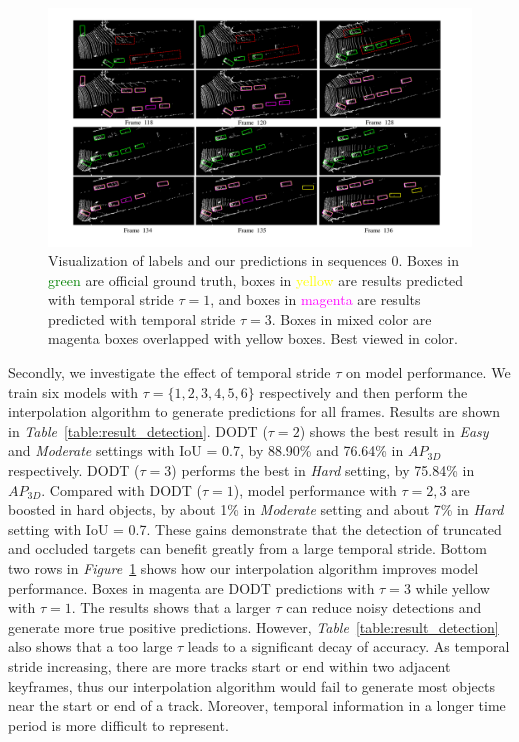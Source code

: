 \documentclass[letterpaper, 10pt, conference]{ieeeconf}  %
\def\figurename{\emph{Figure}}
\def\tablename{\emph{Table}}
\begin{document}
\begin{figure}\centering
	\vspace{-0.8cm}
	\rule{0pt}{1ex}
	\begin{center}
		\includegraphics[trim={2cm, 1cm, 2cm, 1cm}, clip, width=\textwidth]{images/examples.pdf}
	\end{center}
	\setlength{\abovecaptionskip}{-3pt} 
	\caption{Visualization of labels and our predictions in sequences 0. Boxes in \textcolor{green}{green} are official ground truth, boxes in \textcolor{yellow}{yellow} are results predicted with temporal stride $\tau = 1$, and boxes in \textcolor{magenta}{magenta} are results predicted with temporal stride $\tau = 3$. Boxes in mixed color are magenta boxes overlapped with yellow boxes. Best viewed in color.}
	\label{fig:examples}
	\vspace{-0.4cm}
\end{figure}

Secondly, we investigate the effect of temporal stride $\tau$ on model performance. We train six models with $\tau = \{1, 2, 3, 4, 5, 6\}$ respectively and then perform the interpolation algorithm to generate predictions for all frames. Results are shown in \tablename \, \ref{table:result_detection}. DODT ($\tau = 2$) shows the best result in \textit{Easy} and \textit{Moderate} settings with IoU = 0.7, by 88.90\% and 76.64\% in $AP_{3D}$ respectively. DODT ($\tau = 3$) performs the best in \textit{Hard} setting, by 75.84\% in $AP_{3D}$. Compared with DODT ($\tau = 1$), model performance with $\tau = 2, 3$ are boosted in hard objects, by about 1\% in \textit{Moderate} setting and about 7\% in \textit{Hard} setting with IoU = 0.7. These gains demonstrate that the detection of truncated and occluded targets can benefit greatly from a large temporal stride. Bottom two rows in \figurename \, \ref{fig:examples} shows how our interpolation algorithm improves model performance. Boxes in magenta are DODT predictions with $\tau = 3$ while yellow with $\tau = 1$. The results shows that a larger $\tau$ can reduce noisy detections and generate more true positive predictions. However,  \tablename \, \ref{table:result_detection} also shows that a too large $\tau$ leads to a significant decay of accuracy. As temporal stride increasing, there are more tracks start or end within two adjacent keyframes, thus our interpolation algorithm would fail to generate most objects near the start or end of a track. Moreover, temporal information in a longer time period is more difficult to represent.
\end{document}

